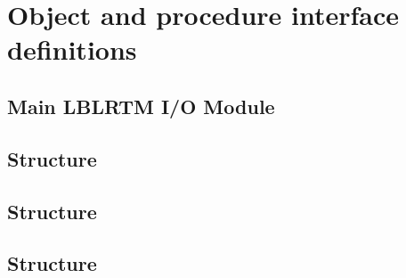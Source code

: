 \chapter{Object and procedure interface definitions}
\label{app:object_and_interface_definition}

\clearpage
\section{Main LBLRTM I/O Module}
\label{sec:LBLRTMIO_Module}



\clearpage
\section{\Fhdr{} Structure}
\label{sec:Fhdr_structure}


\clearpage












\clearpage
\section{\Phdr{} Structure}
\label{sec:Phdr_structure}


\clearpage













\newpage
\section{\Panel{} Structure}
\label{sec:Panel_structure}


